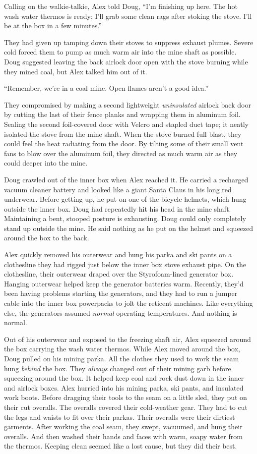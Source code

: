 Calling on the walkie-talkie, Alex told Doug, ``I'm finishing up here.
The hot wash water thermos is ready; I'll grab some clean rags after
stoking the stove. I'll be at the box in a few minutes.''

They had given up tamping down their stoves to suppress exhaust plumes.
Severe cold forced them to pump as much warm air into the mine shaft as
possible. Doug suggested leaving the back airlock door open with the
stove burning while they mined coal, but Alex talked him out of it.

``Remember, we're in a coal mine. Open flames aren't a good idea.''

They compromised by making a second lightweight \emph{uninsulated}
airlock back door by cutting the last of their fence planks and wrapping
them in aluminum foil. Sealing the second foil-covered door with Velcro
and stapled duct tape; it neatly isolated the stove from the mine shaft.
When the stove burned full blast, they could feel the heat radiating
from the door. By tilting some of their small vent fans to blow over the
aluminum foil, they directed as much warm air as they could deeper into
the mine.

Doug crawled out of the inner box when Alex reached it. He carried a
recharged vacuum cleaner battery and looked like a giant Santa Claus in
his long red underwear. Before getting up, he put on one of the bicycle
helmets, which hung outside the inner box. Doug had repeatedly hit his
head in the mine shaft. Maintaining a bent, stooped posture is
exhausting. Doug could only completely stand up outside the mine. He
said nothing as he put on the helmet and squeezed around the box to the
back.

Alex quickly removed his outerwear and hung his parka and ski pants on a
clothesline they had rigged just below the inner box stove exhaust pipe.
On the clothesline, their outerwear draped over the Styrofoam-lined
generator box. Hanging outerwear helped keep the generator batteries
warm. Recently, they'd been having problems starting the generators, and
they had to run a jumper cable into the inner box powerpacks to jolt the
reticent machines. Like everything else, the generators assumed
\emph{normal} operating temperatures. And nothing is normal.

Out of his outerwear and exposed to the freezing shaft air, Alex
squeezed around the box carrying the wash water thermos. While Alex
moved around the box, Doug pulled on his mining parka. All the clothes
they used to work the seam hung \emph{behind} the box. They
\emph{always} changed out of their mining garb before squeezing around
the box. It helped keep coal and rock dust down in the inner and airlock
boxes. Alex hurried into his mining parka, ski pants, and insulated work
boots. Before dragging their tools to the seam on a little sled, they
put on their cut overalls. The overalls covered their cold-weather gear.
They had to cut the legs and waists to fit over their parkas. Their
overalls were their dirtiest garments. After working the coal seam, they
swept, vacuumed, and hung their overalls. And then washed their hands
and faces with warm, soapy water from the thermos. Keeping clean seemed
like a lost cause, but they did their best.

